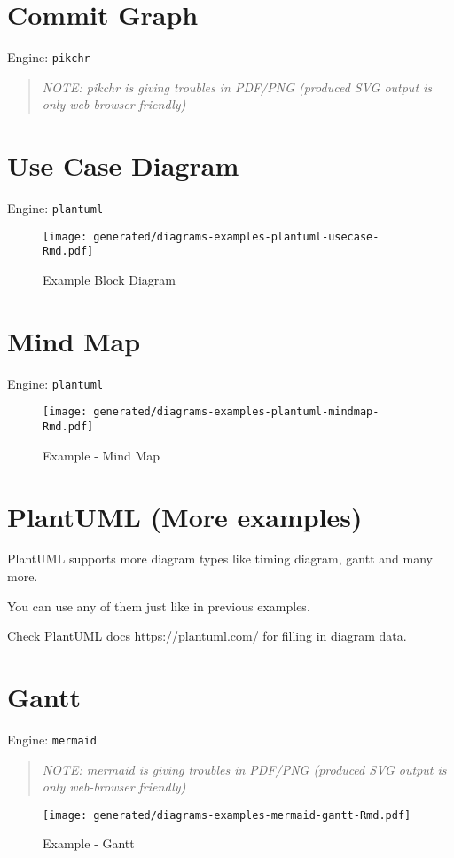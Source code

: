 \documentclass[12pt,a4paper,12pt,oneside,openany]{book}
\begin{document}
\section{Commit Graph}\label{commit-graph}

Engine: \texttt{pikchr}

\begin{quote}
\emph{NOTE: pikchr is giving troubles in PDF/PNG (produced SVG output is only web-browser friendly)}
\end{quote}

\newpage

\section{Use Case Diagram}\label{use-case-diagram}

Engine: \texttt{plantuml}

\begin{figure}
\centering
\texttt{[image: generated/diagrams-examples-plantuml-usecase-Rmd.pdf]}
\caption{Example Block Diagram}
\end{figure}

\newpage

\section{Mind Map}\label{mind-map}

Engine: \texttt{plantuml}

\begin{figure}
\centering
\texttt{[image: generated/diagrams-examples-plantuml-mindmap-Rmd.pdf]}
\caption{Example - Mind Map}
\end{figure}

\newpage

\section{PlantUML (More examples)}\label{plantuml-more-examples}

PlantUML supports more diagram types like timing diagram, gantt and many more.

You can use any of them just like in previous examples.

Check PlantUML docs \url{https://plantuml.com/} for filling in diagram data.

\newpage

\section{Gantt}\label{gantt}

Engine: \texttt{mermaid}

\begin{quote}
\emph{NOTE: mermaid is giving troubles in PDF/PNG (produced SVG output is only web-browser friendly)}
\end{quote}

\begin{figure}
\centering
\texttt{[image: generated/diagrams-examples-mermaid-gantt-Rmd.pdf]}
\caption{Example - Gantt}
\end{figure}


\end{document}
